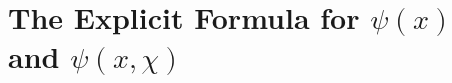 \section{The Explicit Formula for \texorpdfstring{$\psi(x)$}{Lg} and \texorpdfstring{$\psi(x, \chi)$}{Lg}}